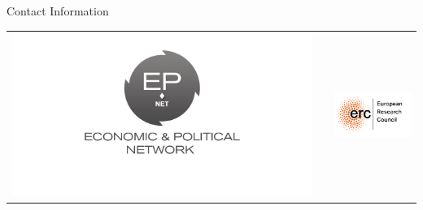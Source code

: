 \documentclass[final]{beamer}
\newlength{\onecolwid}
\begin{document}
\begin{frame}[t]
\begin{columns}[t]
\begin{column}{\onecolwid}
\begin{alertblock}{Contact Information}
\end{alertblock}

\begin{center}
\begin{tabular}{ccc}
\includegraphics[width=0.4\linewidth]{epnet.png} & \hfill & \includegraphics[width=0.4\linewidth]{erc.png}
\end{tabular}
\end{center}


\end{column} %

\end{columns} %

\end{frame} %
\end{document}
